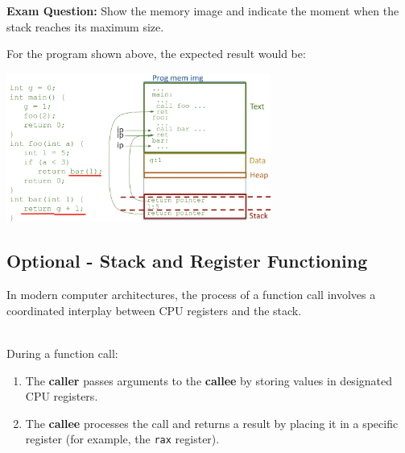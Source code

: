 \textbf{Exam Question:} Show the memory image and indicate the moment when the stack reaches its maximum size.


For the program shown above, the expected result would be:
\begin{center}
  \includegraphics[width=0.65\textwidth]{chapters/L4/images/biggest-stack.png}
\end{center}

\newpage

\subsection{Optional - Stack and Register Functioning}

In modern computer architectures, the process of a function call involves a coordinated interplay between CPU registers and the stack.\\[8px]

\begin{definition}
\leavevmode\\[5px]
During a function call:
\begin{enumerate}
    \item The \textbf{caller} passes arguments to the \textbf{callee} by storing values in designated CPU registers.
    \item The \textbf{callee} processes the call and returns a result by placing it in a specific register (for example, the \texttt{rax} register).
\end{enumerate}
\end{definition}

